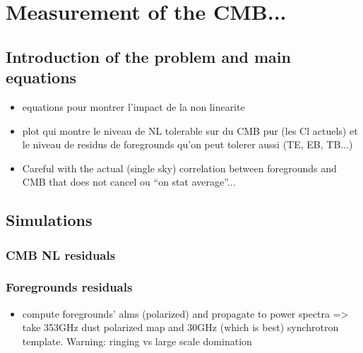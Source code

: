 
\section{Measurement of the CMB...}

\subsection{Introduction of the problem and main equations}
\begin{itemize}
\item equations pour montrer l'impact de la non linearite
\item plot qui montre le niveau de NL tolerable sur du CMB pur (les Cl actuels)
  et le niveau de residus de foregrounds qu'on peut tolerer aussi (TE, EB,
  TB...)
\item Careful with the actual (single sky) correlation between foregrounds and
  CMB that does not cancel ou ``on stat average''...
\end{itemize}

\subsection{Simulations}
\subsubsection{CMB NL residuals}

\subsubsection{Foregrounds residuals}

\begin{itemize}
\item compute foregrounds' alms (polarized) and propagate to power spectra =>
  take 353GHz dust polarized map and 30GHz (which is best) synchrotron
  template. Warning: ringing vs large scale domination
\end{itemize}
